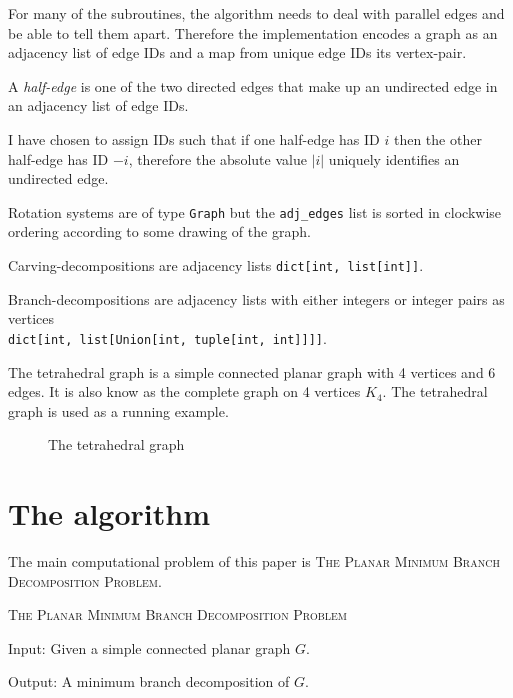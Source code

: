 \documentclass{article}
\begin{document}
	For many of the subroutines, the algorithm needs to deal with parallel edges and be able to tell them apart. Therefore the implementation encodes a graph as an adjacency list of edge IDs and a map from unique edge IDs its vertex-pair.

	A \textit{half-edge} is one of the two directed edges that make up an undirected edge in an adjacency list of edge IDs.
	
	I have chosen to assign IDs such that if one half-edge has ID $i$ then the other half-edge has ID $-i$, therefore the absolute value $|i|$ uniquely identifies an undirected edge.


	Rotation systems are of type \texttt{Graph} but the \texttt{adj_edges} list is sorted in clockwise ordering according to some drawing of the graph.

	Carving-decompositions are adjacency lists \texttt{dict[int, list[int]]}.

	Branch-decompositions are adjacency lists with either integers or integer pairs as vertices\\ \texttt{dict[int, list[Union[int, tuple[int, int]]]]}.

	The tetrahedral graph is a simple connected planar graph with 4 vertices and 6 edges. It is also know as the complete graph on 4 vertices $K_4$. The tetrahedral graph is used as a running example.

	\begin{figure}[H]
		\centering
		
		\caption{The tetrahedral graph}
		\label{fig:tetrahedral}
	\end{figure}

\section{The algorithm}

	The main computational problem of this paper is \textsc{The Planar Minimum Branch Decomposition Problem}.

	\begin{definition}\label{def:mbdp}
		\textsc{The Planar Minimum Branch Decomposition Problem}

		Input: Given a simple connected planar graph $G$.

		Output: A minimum branch decomposition of $G$.
	\end{definition}
\end{document}
